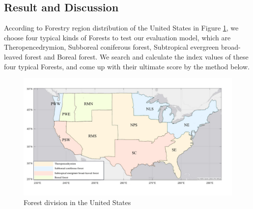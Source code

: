 \documentclass{mcmthesis}
\numberwithin{figure}{section}
\numberwithin{table}{section}
\numberwithin{equation}{section}
\begin{document}
\subsection{Result and Discussion}

According to Forestry region distribution of the United States in Figure \ref{USmap}, 
we choose four typical kinds of Forests to test our evaluation model, which are
Theropencedrymion, Subboreal coniferous forest, Subtropical 
evergreen broad-leaved forest and Boreal forest. We search and calculate the index values
of these four typical Forests, and come up with their ultimate score by the method below.

\begin{figure}[htbp]
  \centering
  \includegraphics[width = 14cm]{code&pic/美国地图.pdf}
  \caption{Forest division in the United States}\label{USmap}
\end{figure}
\end{document}
